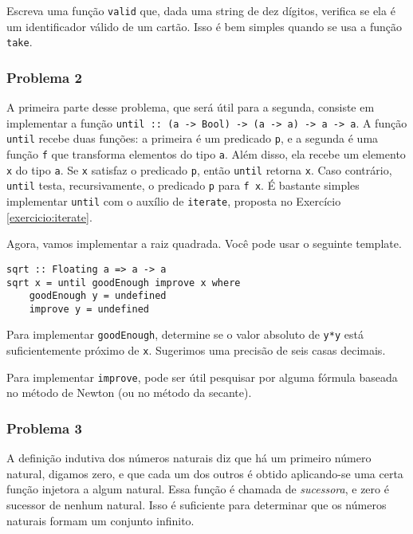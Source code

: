 \documentclass[a4paper]{article}
\begin{document}
Escreva uma função \texttt{valid} que, dada uma string de dez dígitos, verifica se ela é um identificador válido de um cartão.
Isso é bem simples quando se usa a função \texttt{take}.

\subsubsection{Problema 2}

A primeira parte desse problema, que será útil para a segunda, consiste em implementar a função \texttt{until :: (a -> Bool) -> (a -> a) -> a -> a}.
A função \texttt{until} recebe duas funções: a primeira é um predicado \texttt{p}, e a segunda é uma função \texttt{f} que transforma elementos do tipo \texttt{a}.
Além disso, ela recebe um elemento \texttt{x} do tipo \texttt{a}.
Se \texttt{x} satisfaz o predicado \texttt{p}, então \texttt{until} retorna \texttt{x}.
Caso contrário, \texttt{until} testa, recursivamente, o predicado \texttt{p} para \texttt{f x}.
É bastante simples implementar \texttt{until} com o auxílio de \texttt{iterate}, proposta no Exercício \ref{exercicio:iterate}.

Agora, vamos implementar a raiz quadrada.
Você pode usar o seguinte template.

\begin{verbatim}
sqrt :: Floating a => a -> a
sqrt x = until goodEnough improve x where
	goodEnough y = undefined
	improve y = undefined
\end{verbatim}

Para implementar \texttt{goodEnough}, determine se o valor absoluto de \texttt{y*y} está suficientemente próximo de \texttt{x}.
Sugerimos uma precisão de seis casas decimais.

Para implementar \texttt{improve}, pode ser útil pesquisar por alguma fórmula baseada no método de Newton (ou no método da secante).

\subsubsection{Problema 3}

A definição indutiva dos números naturais diz que há um primeiro número natural, digamos zero, e que cada um dos outros é obtido aplicando-se uma certa função injetora a algum natural.
Essa função é chamada de \emph{sucessora}, e zero é sucessor de nenhum natural.
Isso é suficiente para determinar que os números naturais formam um conjunto infinito.
\end{document}
